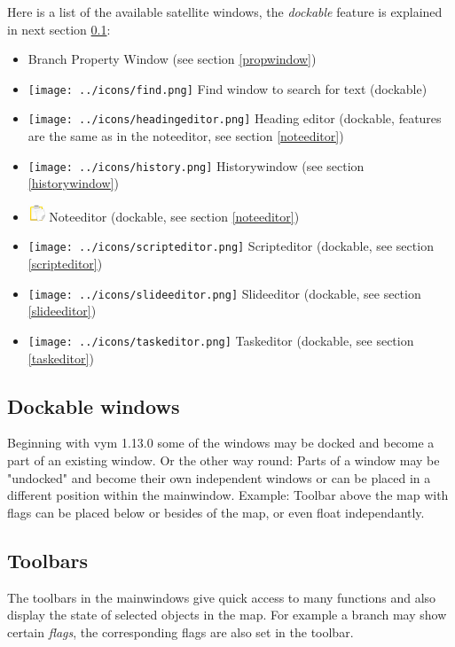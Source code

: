 \documentclass[12pt,a4paper]{article}
\newcommand{\vym}{{\sc vym }}
\begin{document}
Here is a list of the available satellite windows, the {\em dockable}
feature is explained in next section \ref{dockable}:
\begin{itemize}
    \item Branch Property Window (see section \ref{propwindow})
    \item \texttt{[image: ../icons/find.png]}
        Find window to search for text (dockable)
    \item \texttt{[image: ../icons/headingeditor.png]}
        Heading editor (dockable, features are the same as in the
        noteeditor, see section \ref {noteeditor})
    \item \texttt{[image: ../icons/history.png]}
        Historywindow (see section \ref{historywindow})
    \item \includegraphics[width=0.5cm]{images/flags/system/note.png}
        Noteeditor (dockable, see section \ref {noteeditor})
    \item \texttt{[image: ../icons/scripteditor.png]}
        Scripteditor (dockable, see section \ref {scripteditor})
    \item \texttt{[image: ../icons/slideeditor.png]}
        Slideeditor (dockable, see section \ref {slideeditor})
    \item \texttt{[image: ../icons/taskeditor.png]}
        Taskeditor (dockable, see section \ref {taskeditor})
\end{itemize}

\subsection{Dockable windows} \label{dockable}
Beginning with \vym 1.13.0 some of the windows may be docked and become
a part of an existing window. Or the other way round: Parts of a window
may be "undocked" and become their own independent windows or can be
placed in a different position within the mainwindow. Example: Toolbar
above the map with flags can be placed below or besides of the map, or
even float independantly.

\subsection{Toolbars}
The toolbars in the mainwindows give quick access to many functions and
also display the state of selected objects in the map. For example a
branch may show certain {\em flags}, the corresponding flags are also
set in the toolbar. 
\end{document}
